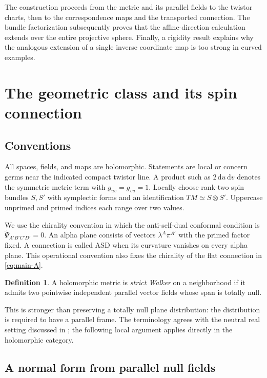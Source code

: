 \documentclass[11pt]{article}
\numberwithin{equation}{section}
\theoremstyle{definition}
\newtheorem{definition}[theorem]{Definition}
\theoremstyle{remark}
\newcommand{\dd}{\mathrm d}
\begin{document}
The construction proceeds from the metric and its parallel fields to the twistor charts, then to the correspondence maps and the transported connection. The bundle factorization subsequently proves that the affine-direction calculation extends over the entire projective sphere. Finally, a rigidity result explains why the analogous extension of a single inverse coordinate map is too strong in curved examples.

\section{The geometric class and its spin connection}

\subsection{Conventions}

All spaces, fields, and maps are holomorphic. Statements are local or concern germs near the indicated compact twistor line. A product such as $2\,\dd u\,\dd v$ denotes the symmetric metric term with $g_{uv}=g_{vu}=1$. Locally choose rank-two spin bundles $S,S'$ with symplectic forms and an identification $TM\simeq S\otimes S'$. Uppercase unprimed and primed indices each range over two values.

We use the chirality convention in which the anti-self-dual conformal condition is $\widetilde\Psi_{A'B'C'D'}=0$. An alpha plane consists of vectors $\lambda^A\pi^{A'}$ with the primed factor fixed. A connection is called ASD when its curvature vanishes on every alpha plane. This operational convention also fixes the chirality of the flat connection in \eqref{eq:main-A}.

\begin{definition}\label{def:strict}
A holomorphic metric is \emph{strict Walker} on a neighborhood if it admits two pointwise independent parallel vector fields whose span is totally null.
\end{definition}

This is stronger than preserving a totally null plane distribution: the distribution is required to have a parallel frame. The terminology agrees with the neutral real setting discussed in \cite[Remark 3]{DRGV}; the following local argument applies directly in the holomorphic category.

\subsection{A normal form from parallel null fields}
\end{document}
